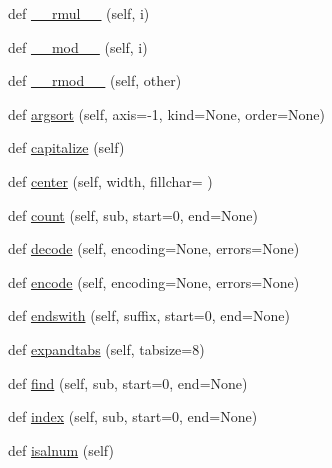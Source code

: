 \begin{DoxyCompactItemize}
\item 
def \hyperlink{classnumpy_1_1core_1_1defchararray_1_1chararray_a86e998982b6f1a16065f0bcda9470205}{\+\_\+\+\_\+rmul\+\_\+\+\_\+} (self, i)
\item 
def \hyperlink{classnumpy_1_1core_1_1defchararray_1_1chararray_a7df2b75515f9eca5bba49cdeeb296d9d}{\+\_\+\+\_\+mod\+\_\+\+\_\+} (self, i)
\item 
def \hyperlink{classnumpy_1_1core_1_1defchararray_1_1chararray_acda9befd8577fbe43946e56920484675}{\+\_\+\+\_\+rmod\+\_\+\+\_\+} (self, other)
\item 
def \hyperlink{classnumpy_1_1core_1_1defchararray_1_1chararray_adf9197f6436a9ff080705869265883d3}{argsort} (self, axis=-\/1, kind=None, order=None)
\item 
def \hyperlink{classnumpy_1_1core_1_1defchararray_1_1chararray_a5b41522387d945818296bcf6db7c7315}{capitalize} (self)
\item 
def \hyperlink{classnumpy_1_1core_1_1defchararray_1_1chararray_a94a90dadd6b611d10f0ec99a08fd62a9}{center} (self, width, fillchar=\textquotesingle{} \textquotesingle{})
\item 
def \hyperlink{classnumpy_1_1core_1_1defchararray_1_1chararray_aa845a74f5ff5dce950aa07a672eb676f}{count} (self, sub, start=0, end=None)
\item 
def \hyperlink{classnumpy_1_1core_1_1defchararray_1_1chararray_a5f2a9b4ad7913678b253aabdf3967488}{decode} (self, encoding=None, errors=None)
\item 
def \hyperlink{classnumpy_1_1core_1_1defchararray_1_1chararray_ac00909f77ebdac35c59847163094f13e}{encode} (self, encoding=None, errors=None)
\item 
def \hyperlink{classnumpy_1_1core_1_1defchararray_1_1chararray_a010b4f20b26efd9f51b3a61023f50bfe}{endswith} (self, suffix, start=0, end=None)
\item 
def \hyperlink{classnumpy_1_1core_1_1defchararray_1_1chararray_a778354eb0f7721623fb1379cc3d6c750}{expandtabs} (self, tabsize=8)
\item 
def \hyperlink{classnumpy_1_1core_1_1defchararray_1_1chararray_a85d762659348568583781462e817637f}{find} (self, sub, start=0, end=None)
\item 
def \hyperlink{classnumpy_1_1core_1_1defchararray_1_1chararray_ab2058399eb54ddb39446641d00a6670b}{index} (self, sub, start=0, end=None)
\item 
def \hyperlink{classnumpy_1_1core_1_1defchararray_1_1chararray_a8bae4cc0960a39357616e8a412a27f88}{isalnum} (self)
\item 

\end{DoxyCompactItemize}

